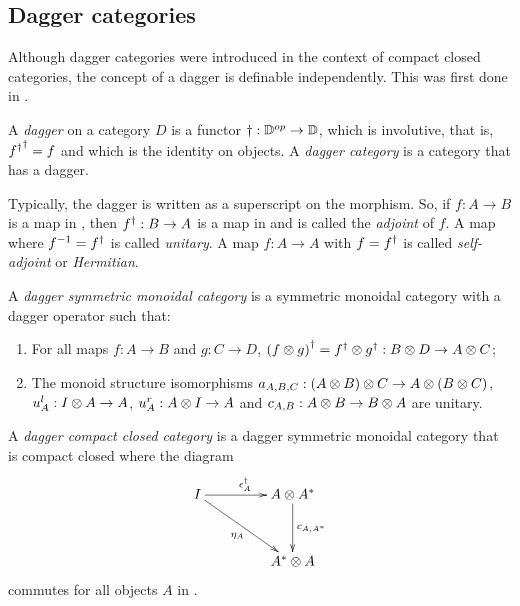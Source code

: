 \subsection{Dagger categories}\label{ssec:daggercategories}

Although dagger categories were introduced in the context of compact closed categories, the concept
of a dagger is definable independently. This was first done in \cite{selinger05:dagger}.

\begin{definition}\label{def:daggercat}
  A \emph{dagger} on a category $D$ is a functor $\dagger:\mathbb{D}^{op}\to \mathbb{D}$, which is  involutive,
  that is, ${{f}^{\dagger}}^{\dagger} = f$ and which is the identity on objects. A \emph{dagger category} is a
  category that has a dagger.
\end{definition}

Typically, the dagger is written as a superscript on the morphism. So, if $f:A\to B$ is a map in
\cD, then ${f}^{\dagger}:B\to A$ is a map in \cD{} and is called the \emph{adjoint} of $f$. A map where
$f^{-1} = {f}^{\dagger}$ is called \emph{unitary}. A map $f:A\to A$ with $f={f}^{\dagger}$ is called
\emph{self-adjoint} or \emph{Hermitian}.

\begin{definition}\label{def:daggersmc}
  A \emph{dagger symmetric monoidal category} is a symmetric monoidal category \cD{} with a dagger
  operator such that:
  \begin{enumerate}[{(}i{)}]
    \item For all maps $f:A\to B$ and $g:C\to D$, ${(f\otimes g)}^{\dagger} = {f}^{\dagger}\otimes{g}^{\dagger}:B\otimes D \to A\otimes C$;\label{defitem:dagger_smc_one}
    \item The monoid structure isomorphisms $a_{A,B,C}:(A\otimes B)\otimes C\to A\otimes(B\otimes C)$, $u^l_{A}:I\otimes A\to
      A$, $u^r_{A}:A\otimes I \to A$ and  $c_{A,B}:A\otimes B \to B\otimes A$ are unitary.\label{defitem:dagger_smc_two}
  \end{enumerate}
\end{definition}


\begin{definition}\label{def:daggercompact}
  A \emph{dagger compact closed category} \cD{} is a dagger symmetric monoidal category
  that is compact closed where the diagram
  \[
    \xymatrix @C+20pt @R+10pt{
      I \ar[r]^{\epsilon^{\dagger}_{A}} \ar[dr]_{\eta_{A}} &A\*A^{*}\ar[d]^{c_{A,A^{*}}}\\
      &A^{*}\* A
    }
  \]
  commutes for all  objects $A$ in \cD.
\end{definition}

